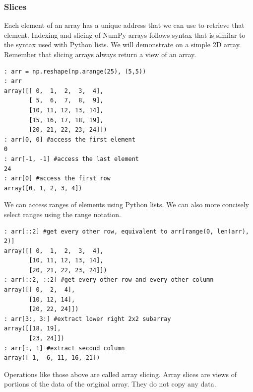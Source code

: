 \subsubsection*{Slices}
Each element of an array has a unique address that we can use to retrieve that element.
Indexing and slicing of NumPy arrays follows syntax that is similar to the syntax used with Python lists.
We will demonstrate on a simple 2D array.
Remember that slicing arrays always return a view of an array.
\begin{lstlisting}
: arr = np.reshape(np.arange(25), (5,5))
: arr
array([[ 0,  1,  2,  3,  4],
       [ 5,  6,  7,  8,  9],
       [10, 11, 12, 13, 14],
       [15, 16, 17, 18, 19],
       [20, 21, 22, 23, 24]])
: arr[0, 0] #access the first element
0
: arr[-1, -1] #access the last element
24
: arr[0] #access the first row
array([0, 1, 2, 3, 4])
\end{lstlisting}
We can access ranges of elements using Python lists.
We can also more concisely select ranges using the  range notation.
\begin{lstlisting}
: arr[::2] #get every other row, equivalent to arr[range(0, len(arr), 2)]
array([[ 0,  1,  2,  3,  4],
       [10, 11, 12, 13, 14],
       [20, 21, 22, 23, 24]])
: arr[::2, ::2] #get every other row and every other column
array([[ 0,  2,  4],
       [10, 12, 14],
       [20, 22, 24]])
: arr[3:, 3:] #extract lower right 2x2 subarray
array([[18, 19],
       [23, 24]])
: arr[:, 1] #extract second column
array([ 1,  6, 11, 16, 21])
\end{lstlisting}
Operations like those above are called array slicing.
Array slices are views of portions of the data of the original array.
They do not copy any data.

